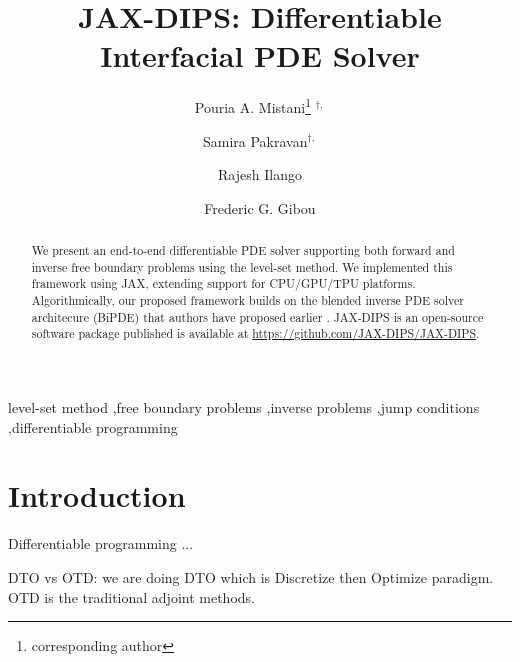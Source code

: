 \documentclass{elsarticle}
\begin{document}
\title{JAX-DIPS: Differentiable Interfacial PDE Solver}



\author[1]{Pouria A. Mistani\thanks{corresponding author} $^{\dagger,}$}
\author[2]{Samira Pakravan$^{\dagger,}$}
\author[1]{Rajesh Ilango}
\author[2]{Frederic G. Gibou}

\address[1]{NVIDIA Corporation, Santa Clara, CA 95051, USA}
\address[2]{University of California, Santa Barbara, CA 93106-5070, USA}

\begin{abstract}
	We present an end-to-end differentiable PDE solver supporting both forward and inverse free boundary problems using the level-set method. We implemented this framework using JAX, extending support for CPU/GPU/TPU platforms. Algorithmically, our proposed framework builds on the blended inverse PDE solver architecure (BiPDE) that authors have proposed earlier \cite{pakravan2021solving}. JAX-DIPS is an open-source software package published is available at \href{https://github.com/JAX-DIPS/JAX-DIPS}{https://github.com/JAX-DIPS/JAX-DIPS}.

\end{abstract}

\begin{keyword}
	level-set method \sep free boundary problems \sep inverse problems \sep jump conditions \sep differentiable programming
\end{keyword}

\maketitle
\def\thefootnote{$\dagger$}







\section{Introduction}
\label{sec::introduction}
Differentiable programming ...

DTO vs OTD: we are doing DTO which is Discretize then Optimize paradigm. OTD is the traditional adjoint methods.
\end{document}
